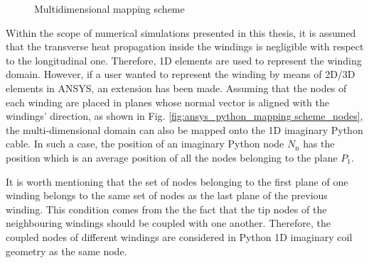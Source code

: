 \begin{figure}[H]
\centering
{}
\caption{Multidimensional mapping scheme}
\label{fig:ansys_python_mapping scheme}
\end{figure}

Within the scope of numerical simulations presented in this thesis, it is assumed that the transverse heat propagation inside the windings is negligible with respect to the longitudinal one. Therefore, 1D elements are used to represent the winding domain. However, if a user wanted to represent the winding by means of 2D/3D elements in ANSYS, an extension has been made. Assuming that the nodes of each winding are placed in planes whose normal vector is aligned with the windings' direction, as shown in Fig. \ref{fig:ansys_python_mapping scheme_nodes}, the multi-dimensional domain can also be mapped onto the 1D imaginary Python cable. In such a case, the position of an imaginary Python node $N_\text{n}$ has the position which is an average position of all the nodes belonging to the plane $P_1$. 

It is worth mentioning that the set of nodes belonging to the first plane of one winding belongs to the same set of nodes as the last plane of the previous winding. This condition comes from the the fact that the tip nodes of the neighbouring windings should be coupled with one another. Therefore, the coupled nodes of different windings are considered in Python 1D imaginary coil geometry as the same node.

